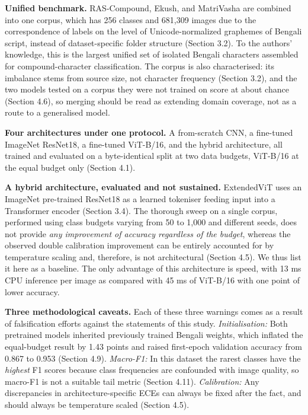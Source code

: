 \textbf{Unified benchmark.} RAS-Compound, Ekush, and MatriVasha are combined into one
corpus, which has 256 classes and 681,309 images due to the correspondence of labels on the level of Unicode-normalized graphemes of
Bengali script, instead of dataset-specific folder structure (Section 3.2). To the authors' knowledge, this is the largest unified set of isolated Bengali characters assembled for compound-character classification.
The corpus is also characterised: its imbalance stems from source size, not character frequency (Section 3.2), and the two models tested on a corpus they were not trained on score at about chance (Section 4.6), so merging should be read as extending domain coverage, not as a route to a generalised model.

\textbf{Four architectures under one protocol.} A from-scratch CNN, a
fine-tuned ImageNet ResNet18, a fine-tuned ViT-B/16, and the hybrid architecture, all
trained and evaluated on a byte-identical split at two data budgets, ViT-B/16 at the equal budget only (Section 4.1).

\textbf{A hybrid architecture, evaluated and not sustained.} ExtendedViT uses an ImageNet pre-trained ResNet18 as a learned tokeniser feeding input into a Transformer encoder (Section 3.4). The thorough sweep on a single corpus, performed using class budgets varying from 50 to 1,000 and different seeds, does not provide \emph{any improvement of accuracy regardless of the budget}, whereas the observed double calibration improvement can be entirely accounted for by temperature scaling and, therefore, is not architectural (Section 4.5).
We thus list it here as a baseline.
The only advantage of this architecture is speed,
with 13 ms CPU inference per image as compared with 45 ms of ViT-B/16 with one point of lower accuracy.

\textbf{Three methodological caveats.} Each of these three warnings comes as a result of falsification efforts against the statements of this study.
\emph{Initialisation:} Both pretrained models inherited previously trained Bengali weights,
which inflated the equal-budget result by 1.43 points and raised first-epoch
validation accuracy from 0.867 to 0.953 (Section 4.9).
\emph{Macro-F1:} In this dataset the rarest classes have the
\emph{highest} F1 scores because class frequencies are confounded with image quality,
so macro-F1 is not a suitable tail metric (Section 4.11).
\emph{Calibration:} Any discrepancies in architecture-specific ECEs can always be fixed after the fact,
and should always be temperature scaled (Section 4.5).

